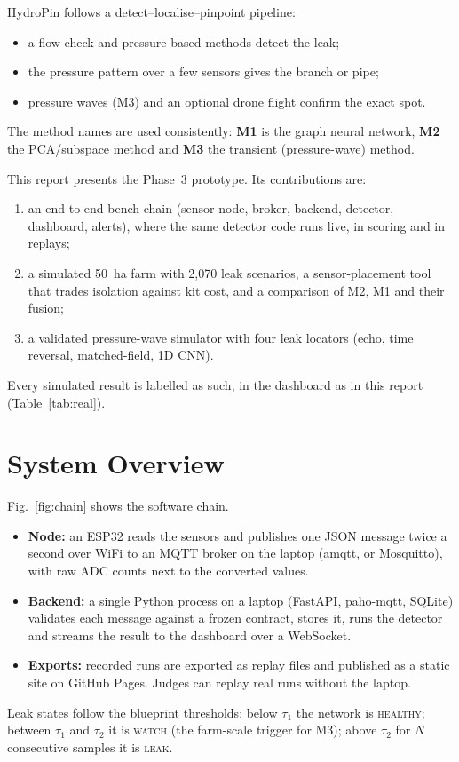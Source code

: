 \documentclass[conference]{IEEEtran}
\begin{document}
HydroPin follows a detect--localise--pinpoint pipeline:
\begin{itemize}
\item a flow check and pressure-based methods detect the leak;
\item the pressure pattern over a few sensors gives the branch or pipe;
\item pressure waves (M3) and an optional drone flight confirm the exact spot.
\end{itemize}
The method names are used consistently: \textbf{M1} is the graph neural network, \textbf{M2}
the PCA/subspace method and \textbf{M3} the transient (pressure-wave) method.

This report presents the Phase~3 prototype. Its contributions are:
\begin{enumerate}
\item an end-to-end bench chain (sensor node, broker, backend, detector, dashboard, alerts),
  where the same detector code runs live, in scoring and in replays;
\item a simulated 50~ha farm with 2,070 leak scenarios, a sensor-placement tool that trades
  isolation against kit cost, and a comparison of M2, M1 and their fusion;
\item a validated pressure-wave simulator with four leak locators (echo, time reversal,
  matched-field, 1D CNN).
\end{enumerate}
Every simulated result is labelled as such, in the dashboard as in this report
(Table~\ref{tab:real}).

\section{System Overview}
Fig.~\ref{fig:chain} shows the software chain.
\begin{itemize}
\item \textbf{Node:} an ESP32 reads the sensors and publishes one JSON message twice a second
  over WiFi to an MQTT broker on the laptop (amqtt, or Mosquitto), with raw ADC counts next to
  the converted values.
\item \textbf{Backend:} a single Python process on a laptop (FastAPI, paho-mqtt, SQLite)
  validates each message against a frozen contract, stores it, runs the detector and streams
  the result to the dashboard over a WebSocket.
\item \textbf{Exports:} recorded runs are exported as replay files and published as a static
  site on GitHub Pages. Judges can replay real runs without the laptop.
\end{itemize}
Leak states follow the blueprint thresholds: below $\tau_1$ the network is \textsc{healthy};
between $\tau_1$ and $\tau_2$ it is \textsc{watch} (the farm-scale trigger for M3); above
$\tau_2$ for $N$ consecutive samples it is \textsc{leak}.
\end{document}
